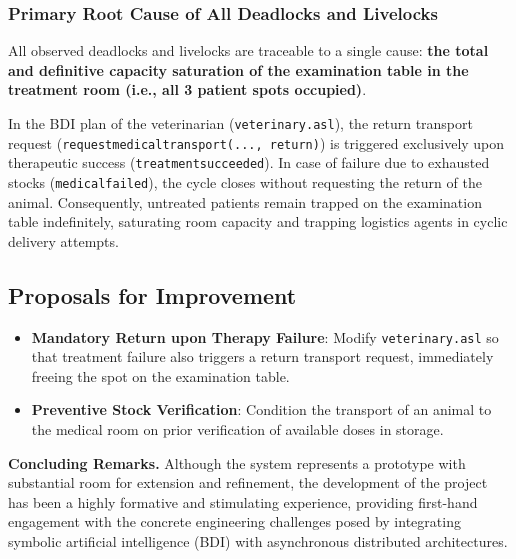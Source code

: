 \documentclass{article}
\renewcommand{\_}{\oldtextunderscore\allowbreak}
\begin{document}
\subsubsection{Primary Root Cause of All Deadlocks and Livelocks}
All observed deadlocks and livelocks are traceable to a single cause: \textbf{the total and definitive capacity saturation of the examination table in the treatment room (i.e., all 3 patient spots occupied)}.

In the BDI plan of the veterinarian (\texttt{veterinary.asl}), the return transport request (\texttt{request\_medical\_transport(..., return)}) is triggered exclusively upon therapeutic success (\texttt{treatment\_succeeded}). In case of failure due to exhausted stocks (\texttt{medical\_failed}), the cycle closes without requesting the return of the animal. Consequently, untreated patients remain trapped on the examination table indefinitely, saturating room capacity and trapping logistics agents in cyclic delivery attempts.

\subsection{Proposals for Improvement}
\begin{itemize}
    \item \textbf{Mandatory Return upon Therapy Failure}: Modify \texttt{veterinary.asl} so that treatment failure also triggers a return transport request, immediately freeing the spot on the examination table.
    \item \textbf{Preventive Stock Verification}: Condition the transport of an animal to the medical room on prior verification of available doses in storage.
\end{itemize}

\bigskip
\noindent\textbf{Concluding Remarks.} Although the system represents a prototype with substantial room for extension and refinement, the development of the project has been a highly formative and stimulating experience, providing first-hand engagement with the concrete engineering challenges posed by integrating symbolic artificial intelligence (BDI) with asynchronous distributed architectures.
\end{document}
